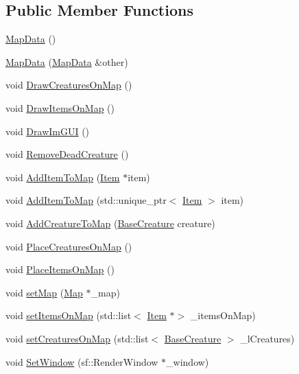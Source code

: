 \subsection*{Public Member Functions}
\begin{DoxyCompactItemize}
\item 
\mbox{\hyperlink{class_map_data_aca1581fc02ec46b4da7ed9b83c04a116}{Map\+Data}} ()
\item 
\mbox{\hyperlink{class_map_data_a4f905b12cec13eb4c1c3caaa88998898}{Map\+Data}} (\mbox{\hyperlink{class_map_data}{Map\+Data}} \&other)
\item 
void \mbox{\hyperlink{class_map_data_ad7ff044e19425487082134fe86221d07}{Draw\+Creatures\+On\+Map}} ()
\item 
void \mbox{\hyperlink{class_map_data_abfdefc2bef87a02d3d83176ad6ba7832}{Draw\+Items\+On\+Map}} ()
\item 
void \mbox{\hyperlink{class_map_data_a6e25b7e4936363f67f356911d46d4ef6}{Draw\+Im\+G\+UI}} ()
\item 
void \mbox{\hyperlink{class_map_data_a737946a4648a34f99452a6bff1b727f6}{Remove\+Dead\+Creature}} ()
\item 
void \mbox{\hyperlink{class_map_data_a134c2de11f90b487d30fdae6570bc256}{Add\+Item\+To\+Map}} (\mbox{\hyperlink{class_item}{Item}} $\ast$item)
\item 
void \mbox{\hyperlink{class_map_data_a27d20220e1bd6db934312f30a15dbcb0}{Add\+Item\+To\+Map}} (std\+::unique\+\_\+ptr$<$ \mbox{\hyperlink{class_item}{Item}} $>$ item)
\item 
void \mbox{\hyperlink{class_map_data_ab54fe2f14d5192d3e1683a6c48839f80}{Add\+Creature\+To\+Map}} (\mbox{\hyperlink{class_base_creature}{Base\+Creature}} creature)
\item 
void \mbox{\hyperlink{class_map_data_ad377a46f779bfcb9ac57dcdd3a969eca}{Place\+Creatures\+On\+Map}} ()
\item 
void \mbox{\hyperlink{class_map_data_aae575fa856f1d179220c4781873fd635}{Place\+Items\+On\+Map}} ()
\item 
void \mbox{\hyperlink{class_map_data_a8adfe57c9e74b6e306540dcb003feb95}{set\+Map}} (\mbox{\hyperlink{class_map}{Map}} $\ast$\+\_\+map)
\item 
void \mbox{\hyperlink{class_map_data_a44e4f889a01270765db90de0ebb62aa5}{set\+Items\+On\+Map}} (std\+::list$<$ \mbox{\hyperlink{class_item}{Item}} $\ast$$>$ \+\_\+items\+On\+Map)
\item 
void \mbox{\hyperlink{class_map_data_ad62fed28a640928527502b00b291aabd}{set\+Creatures\+On\+Map}} (std\+::list$<$ \mbox{\hyperlink{class_base_creature}{Base\+Creature}} $>$ \+\_\+l\+Creatures)
\item 
void \mbox{\hyperlink{class_map_data_a2c65f950748fe264276e292f8a5b92f5}{Set\+Window}} (sf\+::\+Render\+Window $\ast$\+\_\+window)
\end{DoxyCompactItemize}
